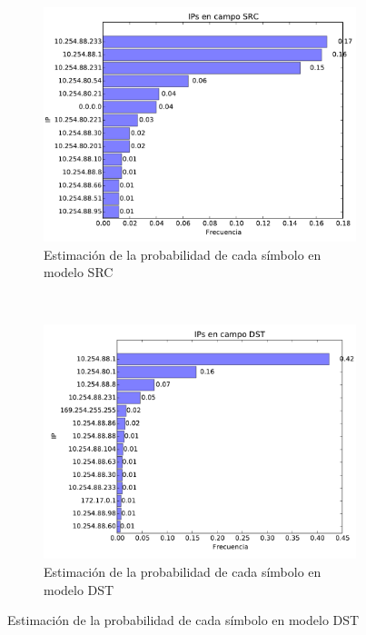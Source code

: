 \begin{figure}[H]
	\center
	\begin{subfigure}{0.4\textwidth}
		\includegraphics[width=1.0\textwidth]{resultados/starbucks/ipsSrc_4_6187931499.pdf}
		\caption{Estimaci\'on de la probabilidad de cada s\'imbolo en modelo SRC}
	\end{subfigure}
	~
	\begin{subfigure}{0.4\textwidth}
		\includegraphics[width=1.0\textwidth]{resultados/starbucks/ipsDst_3_76848714287.pdf}
		\caption{Estimaci\'on de la probabilidad de cada s\'imbolo en modelo DST}
	\end{subfigure}
\end{figure}

